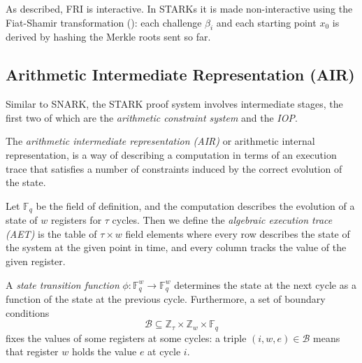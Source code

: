 \documentclass[../../book]{subfiles}
\begin{document}
\begin{remark}
  As described, FRI is interactive. In STARKs it is made non-interactive using the Fiat-Shamir
  transformation (): each challenge $\beta_i$ and each starting point $x_0$
  is derived by hashing the Merkle roots sent so far.
\end{remark}

\subsection{Arithmetic Intermediate Representation (AIR)}\label{subsec:air}
Similar to SNARK, the STARK proof system involves intermediate stages, the first two of which are the \emph{arithmetic constraint system} and the \emph{IOP}.

\begin{definition}\label{def:air}
  The \emph{arithmetic intermediate representation (AIR)} or arithmetic internal representation, is a way of describing a computation in terms of an execution trace that satisfies a number of constraints induced by the correct evolution of the state.
\end{definition}

\begin{definition}\label{def:aet}
  Let $\mathbb{F}_q$ be the field of definition, and the computation describes the evolution of a state of $w$ registers for $\tau$ cycles. Then we define the \emph{algebraic execution trace (AET)} is the table of $\tau \times w$ field elements where every row describes the state of the system at the given point in time, and every column tracks the value of the given register.
\end{definition}

\begin{definition}\label{def:st-function}
  A \emph{state transition function} $\phi:\mathbb{F}_q^{w}\rightarrow\mathbb{F}_q^{w}$ determines the state at the next cycle as a function of the state at the previous cycle. Furthermore, a set of boundary conditions 
  \begin{equation*}
    \mathcal{B}\subseteq \mathbb{Z}_\tau \times\mathbb{Z}_w\times\mathbb{F}_q
  \end{equation*}
  fixes the values of some registers at some cycles: a triple $(i,w,e) \in \mathcal{B}$ means that register $w$ holds the value $e$ at cycle $i$.
\end{definition}
\end{document}
